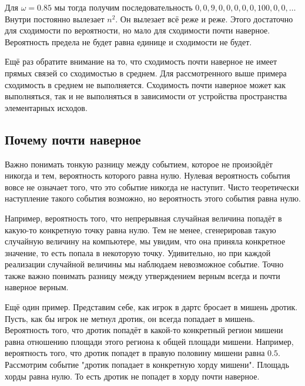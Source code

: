 \documentclass[12pt, a4paper, oneside]{article}
\begin{document}
\begin{center}
\end{center}

Для $\omega = 0.85$ мы тогда получим последовательность $0, 0, 9, 0, 0, 0, 0, 0, 100, 0, 0, \ldots$ Внутри постоянно вылезает $n^2$. Он вылезает всё реже и реже. Этого достаточно для сходимости по вероятности, но мало для сходимости почти наверное. Вероятность предела не будет равна единице и сходимости не будет. 

Ещё раз обратите внимание на то, что сходимость почти наверное не имеет прямых связей со сходимостью в среднем. Для рассмотренного выше примера сходимость в среднем не выполняется. Сходимость почти наверное может как выполняться, так и не выполняться в зависимости от устройства пространства элементарных исходов.

\subsection{Почему почти наверное} 

Важно понимать тонкую разницу между событием, которое не произойдёт никогда и тем, вероятность которого равна нулю.  Нулевая вероятность события вовсе не означает того, что это событие никогда не наступит. Чисто теоретически наступление такого события возможно, но вероятность этого события равна нулю.

Например, вероятность того, что непрерывная случайная величина попадёт в какую-то конкретную точку равна нулю. Тем не менее, сгенерировав такую случайную величину на компьютере, мы увидим, что она приняла конкретное значение, то есть попала в некоторую точку. Удивительно, но при каждой реализации случайной величины мы наблюдаем невозможное событие. Точно также важно понимать разницу между утверждением верным всегда и почти наверное верным. 

Ещё один пример. Представим себе, как игрок в дартс бросает в мишень дротик. Пусть, как бы игрок не метнул дротик, он всегда попадает в мишень. Вероятность того, что дротик попадёт в какой-то конкретный регион мишени равна отношению площади этого региона к общей площади мишени. Например, вероятность того, что дротик попадет в правую половину мишени равна $0.5$. 
Рассмотрим событие "дротик попадает в конкретную хорду мишени". Площадь хорды равна нулю. То есть дротик не попадет в хорду почти наверное.
\end{document}
